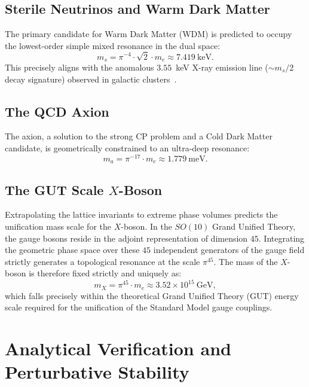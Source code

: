\documentclass[onecolumn,aps,prd,superscriptaddress,nofootinbib,amsmath,amssymb]{revtex4-2}
\theoremstyle{definition}
\theoremstyle{remark}
\begin{document}
\subsection{Sterile Neutrinos and Warm Dark Matter}
The primary candidate for Warm Dark Matter (WDM) is predicted to occupy the lowest-order simple mixed resonance in the dual space:
\begin{equation}
m_{s} = \pi^{-4} \cdot \sqrt{2} \cdot m_e \approx 7.419~\text{keV}.
\label{eq:sterile_nu}
\end{equation}
This precisely aligns with the anomalous $3.55$~keV X-ray emission line ($\sim m_s/2$ decay signature) observed in galactic clusters~\cite{boyarsky2014}.

\subsection{The QCD Axion}
The axion, a solution to the strong CP problem and a Cold Dark Matter candidate, is geometrically constrained to an ultra-deep resonance:
\begin{equation}
m_{a} = \pi^{-17} \cdot m_e \approx 1.779~\text{meV}.
\label{eq:axion}
\end{equation}

\subsection{The GUT Scale $X$-Boson}
Extrapolating the lattice invariants to extreme phase volumes predicts the unification mass scale for the $X$-boson. In the $SO(10)$ Grand Unified Theory, the gauge bosons reside in the adjoint representation of dimension $45$. Integrating the geometric phase space over these $45$ independent generators of the gauge field strictly generates a topological resonance at the scale $\pi^{45}$. The mass of the $X$-boson is therefore fixed strictly and uniquely as:
\begin{equation}
m_X = \pi^{45} \cdot m_e \approx 3.52 \times 10^{15}~\text{GeV},
\label{eq:gut_scale_so10}
\end{equation}
which falls precisely within the theoretical Grand Unified Theory (GUT) energy scale required for the unification of the Standard Model gauge couplings.

\section{Analytical Verification and Perturbative Stability}
\label{sec:verification}
\end{document}
